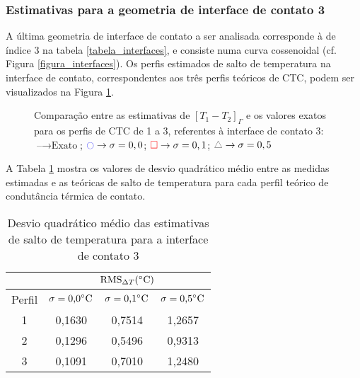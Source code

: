 \subsubsection{Estimativas para a geometria de interface de contato 3}

A última geometria de interface de contato a ser analisada corresponde à de índice 3 na tabela \ref{tabela_interfaces}, e consiste numa curva cossenoidal (cf. Figura \ref{figura_interfaces}).  Os perfis estimados de salto de temperatura na interface de contato, correspondentes aos três perfis teóricos de CTC, podem ser visualizados na Figura \ref{figura_delta_temperaturas_interface_03}.

\begin{figure}[H]
	\caption{Comparação entre as estimativas de $[T_1 - T_2]_\Gamma$ e os valores exatos para os perfis de CTC de 1 a 3, referentes à interface de contato 3: $\text{--} \rightarrow \text{Exato}$; $\textcolor{blue}{\ocircle} \rightarrow \sigma = 0,0$; $\textcolor{red}{\square} \rightarrow \sigma = 0,1$; $\textcolor{gray}{\triangle} \rightarrow \sigma = 0,5$}
	\label{figura_delta_temperaturas_interface_03}
\end{figure}

A Tabela \ref{tabela_rms_delta_temperaturas_interface_3} mostra os valores de desvio quadrático médio entre as medidas estimadas e as teóricas de salto de temperatura para cada perfil teórico de condutância térmica de contato.
\begin{table}[H]
	\centering
	\caption{Desvio quadrático médio das estimativas de salto de temperatura para a interface de contato 3}
	\begin{tabular}{c|c|c|c|}
		\cline{2-4}
		& \multicolumn{3}{c|}{$\text{RMS}_{\Delta T} (\celsius)$} \\ \hline
		\multicolumn{1}{|c|}{Perfil} & $\sigma = \text{0,0}\celsius$   & $\sigma = \text{0,1}\celsius$    & $\sigma = \text{0,5}\celsius$  \\ \hline
		\multicolumn{1}{|c|}{1}      & 0,1630       & 0,7514       & 1,2657      \\ \hline
		\multicolumn{1}{|c|}{2}      & 0,1296       & 0,5496       & 0,9313      \\ \hline
		\multicolumn{1}{|c|}{3}      & 0,1091       & 0,7010       & 1,2480      \\ \hline
	\end{tabular}
	\label{tabela_rms_delta_temperaturas_interface_3}
\end{table}

